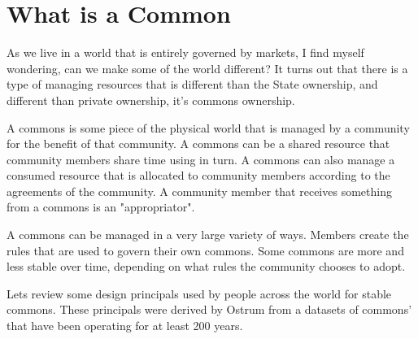 \documentclass{article}
\begin{document}
\pagebreak

\section{What is a Common}

\vspace{0.2cm}

As we live in a world that is entirely governed by markets, I find myself wondering, can we make some of the world different? It turns out that there is a type of managing resources that is different than the State ownership, and different than private ownership, it's commons ownership. 

A commons is some piece of the physical world that is managed by a community for the benefit of that community. A commons can be a shared resource that community members share time using in turn. A commons can also manage a consumed resource that is allocated to community members according to the agreements of the community. A community member that receives something from a commons is an "appropriator".

A commons can be managed in a very large variety of ways. Members create the rules that are used to govern their own commons. Some commons are more and less stable over time, depending on what rules the community chooses to adopt. 


Lets review some design principals used by people across the world for stable commons. These principals were derived by Ostrum from a datasets of commons' that have been operating for at least 200 years. 
\end{document}

